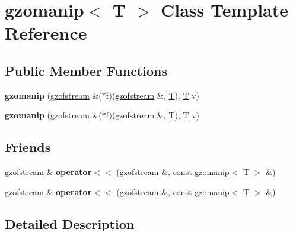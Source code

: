 \hypertarget{classgzomanip}{}\section{gzomanip$<$ T $>$ Class Template Reference}
\label{classgzomanip}
\subsection*{Public Member Functions}
\begin{DoxyCompactItemize}
\item 
\mbox{\label{classgzomanip_a62e624a4096f8d543472895936b80c13}} 
{\bfseries gzomanip} (\hyperlink{classgzofstream}{gzofstream} \&($\ast$f)(\hyperlink{classgzofstream}{gzofstream} \&, \hyperlink{group___sparse_core___module}{T}), \hyperlink{group___sparse_core___module}{T} v)
\item 
\mbox{\label{classgzomanip_a62e624a4096f8d543472895936b80c13}} 
{\bfseries gzomanip} (\hyperlink{classgzofstream}{gzofstream} \&($\ast$f)(\hyperlink{classgzofstream}{gzofstream} \&, \hyperlink{group___sparse_core___module}{T}), \hyperlink{group___sparse_core___module}{T} v)
\end{DoxyCompactItemize}
\subsection*{Friends}
\begin{DoxyCompactItemize}
\item 
\mbox{\label{classgzomanip_ace1e67eb789a4d1577a12cfcf782f22e}} 
\hyperlink{classgzofstream}{gzofstream} \& {\bfseries operator$<$$<$} (\hyperlink{classgzofstream}{gzofstream} \&, const \hyperlink{classgzomanip}{gzomanip}$<$ \hyperlink{group___sparse_core___module}{T} $>$ \&)
\item 
\mbox{\label{classgzomanip_ace1e67eb789a4d1577a12cfcf782f22e}} 
\hyperlink{classgzofstream}{gzofstream} \& {\bfseries operator$<$$<$} (\hyperlink{classgzofstream}{gzofstream} \&, const \hyperlink{classgzomanip}{gzomanip}$<$ \hyperlink{group___sparse_core___module}{T} $>$ \&)
\end{DoxyCompactItemize}


\subsection{Detailed Description}
